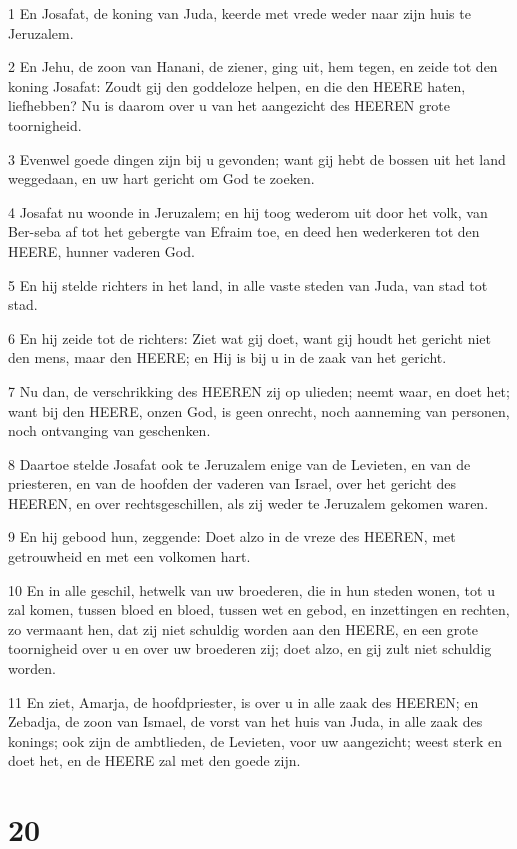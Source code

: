\par 1 En Josafat, de koning van Juda, keerde met vrede weder naar zijn huis te Jeruzalem.
\par 2 En Jehu, de zoon van Hanani, de ziener, ging uit, hem tegen, en zeide tot den koning Josafat: Zoudt gij den goddeloze helpen, en die den HEERE haten, liefhebben? Nu is daarom over u van het aangezicht des HEEREN grote toornigheid.
\par 3 Evenwel goede dingen zijn bij u gevonden; want gij hebt de bossen uit het land weggedaan, en uw hart gericht om God te zoeken.
\par 4 Josafat nu woonde in Jeruzalem; en hij toog wederom uit door het volk, van Ber-seba af tot het gebergte van Efraim toe, en deed hen wederkeren tot den HEERE, hunner vaderen God.
\par 5 En hij stelde richters in het land, in alle vaste steden van Juda, van stad tot stad.
\par 6 En hij zeide tot de richters: Ziet wat gij doet, want gij houdt het gericht niet den mens, maar den HEERE; en Hij is bij u in de zaak van het gericht.
\par 7 Nu dan, de verschrikking des HEEREN zij op ulieden; neemt waar, en doet het; want bij den HEERE, onzen God, is geen onrecht, noch aanneming van personen, noch ontvanging van geschenken.
\par 8 Daartoe stelde Josafat ook te Jeruzalem enige van de Levieten, en van de priesteren, en van de hoofden der vaderen van Israel, over het gericht des HEEREN, en over rechtsgeschillen, als zij weder te Jeruzalem gekomen waren.
\par 9 En hij gebood hun, zeggende: Doet alzo in de vreze des HEEREN, met getrouwheid en met een volkomen hart.
\par 10 En in alle geschil, hetwelk van uw broederen, die in hun steden wonen, tot u zal komen, tussen bloed en bloed, tussen wet en gebod, en inzettingen en rechten, zo vermaant hen, dat zij niet schuldig worden aan den HEERE, en een grote toornigheid over u en over uw broederen zij; doet alzo, en gij zult niet schuldig worden.
\par 11 En ziet, Amarja, de hoofdpriester, is over u in alle zaak des HEEREN; en Zebadja, de zoon van Ismael, de vorst van het huis van Juda, in alle zaak des konings; ook zijn de ambtlieden, de Levieten, voor uw aangezicht; weest sterk en doet het, en de HEERE zal met den goede zijn.

\chapter{20}

